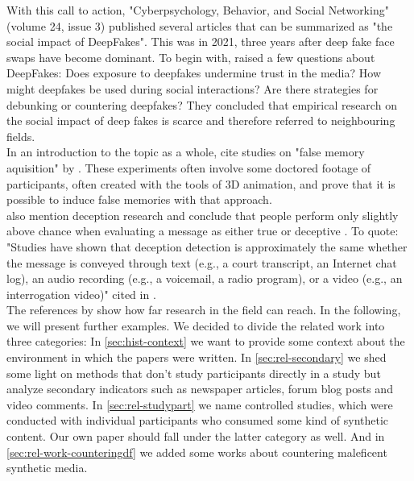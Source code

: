 \documentclass[
  a4paper,  %
  twoside,  %
  bibliography=totoc,
  headsepline,
  cleardoublepage=empty,
  parskip=half,
  draft=false
]{scrbook}
\begin{document}
With this call to action, "Cyberpsychology, Behavior, and Social Networking" (volume 24, issue 3) published several articles that can be summarized as "the social impact of DeepFakes". This was in 2021, three years after deep fake face swaps have become dominant. To begin with, \citet{hancockSocialImpactDeepfakes2021} raised a few questions about DeepFakes: Does exposure to deepfakes undermine trust in the media? How might deepfakes be used during social interactions? Are there strategies for debunking or countering deepfakes? They concluded that empirical research on the social impact of deep fakes is scarce and therefore referred to neighbouring fields. \\
In an introduction to the topic as a whole, \citet{hancockSocialImpactDeepfakes2021} cite studies on "false memory aquisition" by \citet{garryActuallyPictureWorth2005}. These experiments often involve some doctored footage of participants, often created with the tools of 3D animation, and prove that it is possible to induce false memories with that approach. \\
\citet{hancockSocialImpactDeepfakes2021} also mention deception research and conclude that people perform only slightly above chance when evaluating a message as either true or deceptive \cite{bondAccuracyDeceptionJudgments2006}. To quote: "Studies have shown that deception detection is approximately the same whether the message is conveyed through text (e.g., a court transcript, an Internet chat log), an audio recording (e.g., a voicemail, a radio program), or a video (e.g., an interrogation video)" \cite{hancockSeeNoEvil2010} cited in \cite{hancockSocialImpactDeepfakes2021}. \\
The references by \citet{hancockSocialImpactDeepfakes2021} show how far research in the field can reach. In the following, we will present further examples. We decided to divide the related work into three categories: In \ref{sec:hist-context} we want to provide some context about the environment in which the papers were written. In \ref{sec:rel-secondary} we shed some light on methods that don't study participants directly in a study but analyze secondary indicators such as newspaper articles, forum blog posts and video comments. In \ref{sec:rel-studypart} we name controlled studies, which were conducted with individual participants who consumed some kind of synthetic content. Our own paper should fall under the latter category as well. And in \ref{sec:rel-work-counteringdf} we added some works about countering maleficent synthetic media.
\end{document}
